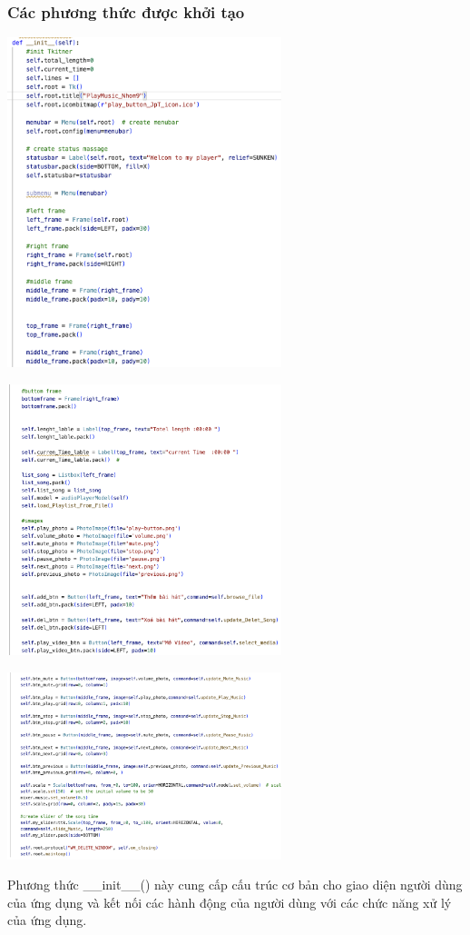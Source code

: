 \documentclass[a4paper]{article}
\begin{document}
\subsubsection{Các phương thức được khởi tạo}
\begin{center}
\includegraphics[width=80mm]{template_SGU 2/view_init_1.png}
\end{center}
\begin{center}
\includegraphics[width=80mm]{template_SGU 2/view_init_2.png}
\end{center}
\begin{center}
\includegraphics[width=80mm]{template_SGU 2/view_init_3.png}
\end{center}
\hspace*{0.5} Phương thức \_\_init\_\_() này cung cấp cấu trúc cơ bản cho giao diện người dùng của ứng dụng và kết nối các hành động của người dùng với các chức năng xử lý của ứng dụng.
\end{document}
